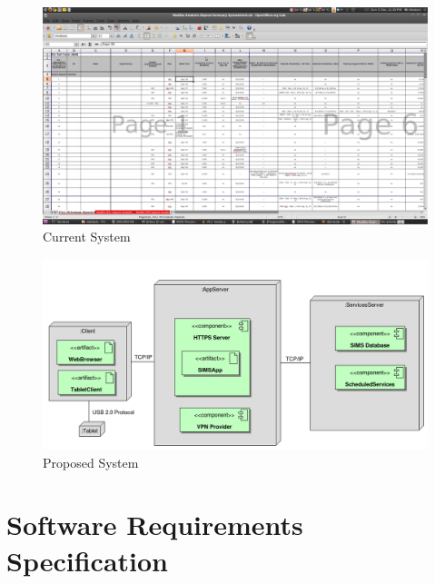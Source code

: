 \documentclass{journal}
\begin{document}
\begin{figure}[htp]
\centering
\includegraphics[scale=0.25]{diagrams/Current_System.png}
\caption{Current System}
\label{fig:Curr_Sys}
\end{figure}

\begin{figure}[htp]
\centering
\includegraphics[scale=0.40]{diagrams/SystemOverview.png}
\caption{Proposed System}
\label{fig:New_Sys}
\end{figure}

\section{Software Requirements Specification}
\end{document}
